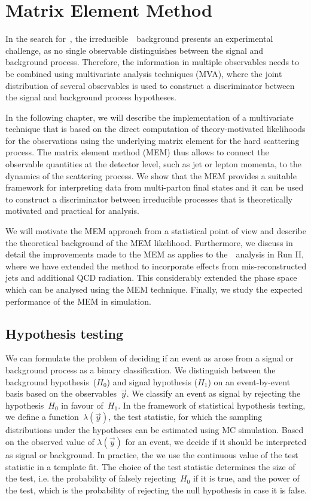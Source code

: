 \chapter{Matrix Element Method}
\label{sec:mem}
In the search for~\ttHbb, the irreducible~\ttbb~background presents an experimental challenge, as no single observable distinguishes between the signal and background process. Therefore, the information in multiple observables needs to be combined using multivariate analysis techniques (MVA), where the joint distribution of several observables is used to construct a discriminator between the signal and background process hypotheses.

In the following chapter, we will describe the implementation of a multivariate technique that is based on the direct computation of theory-motivated likelihoods for the observations using the underlying matrix element for the hard scattering process. The matrix element method (MEM) thus allows to connect the observable quantities at the detector level, such as jet or lepton momenta, to the dynamics of the scattering process. We show that the MEM provides a suitable framework for interpreting data from multi-parton final states and it can be used to construct a discriminator between irreducible processes that is theoretically motivated and practical for analysis.

We will motivate the MEM approach from a statistical point of view and describe the theoretical background of the MEM likelihood. Furthermore, we discuss in detail the improvements made to the MEM as applies to the~\ttHbb~analysis in Run II, where we have extended the method to incorporate effects from mis-reconstructed jets and additional QCD radiation. This considerably extended the phase space which can be analysed using the MEM technique. Finally, we study the expected performance of the MEM in simulation.

\section{Hypothesis testing}
\label{sec:test_statistic}
We can formulate the problem of deciding if an event as arose from a signal or background process as a binary classification. We distinguish between the background hypothesis~($H_0$) and signal hypothesis ($H_1$) on an event-by-event basis based on the observables~$\vec{y}$. We classify an event as signal by rejecting the hypothesis~$H_0$ in favour of~$H_1$. In the framework of statistical hypothesis testing, we define a function~$\lambda(\vec{y})$, the test statistic, for which the sampling distributions under the hypotheses can be estimated using MC simulation. Based on the observed value of $\lambda(\vec{y})$ for an event, we decide if it should be interpreted as signal or background. In practice, the we use the continuous value of the test statistic in a template fit. The choice of the test statistic determines the size of the test, i.e. the probability of falsely rejecting~$H_0$ if it is true, and the power of the test, which is the probability of rejecting the null hypothesis in case it is false.


